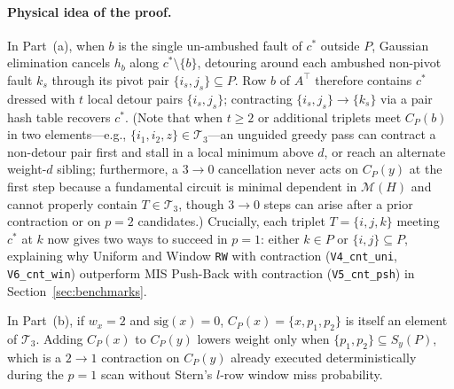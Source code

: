 \documentclass[12pt]{article}
\theoremstyle{definition}
\newcommand{\Tc}{\mathcal{T}_3}
\newcommand{\ttt}[1]{\texttt{#1}}
\begin{document}
\paragraph{Physical idea of the proof.}
In Part~(a), when $b$ is the single un-ambushed fault of $c^*$ outside $P$, Gaussian elimination cancels $h_b$
along $c^* \setminus \{b\}$, detouring around each ambushed non-pivot fault $k_s$ through its pivot pair $\{i_s,
j_s\} \subseteq P$. Row $b$ of $A^\top$ therefore contains $c^*$ dressed with $t$ local detour pairs $\{i_s,
j_s\}$; contracting $\{i_s, j_s\} \to \{k_s\}$ via a pair hash table recovers $c^*$. (Note that when $t \ge 2$ or
additional triplets meet $C_P(b)$ in two elements---e.g., $\{i_1, i_2, z\} \in \Tc$---an unguided greedy pass can
contract a non-detour pair first and stall in a local minimum above $d$, or reach an alternate weight-$d$ sibling;
furthermore, a $3 \to 0$ cancellation never acts on $C_P(y)$ at the first step because a fundamental circuit is
minimal dependent in $\mathcal{M}(H)$ and cannot properly contain $T \in \Tc$, though $3 \to 0$ steps can arise
after a prior contraction or on $p = 2$ candidates.) Crucially, each triplet $T = \{i, j, k\}$ meeting $c^*$ at $k$
now gives two ways to succeed in $p = 1$: either $k \in P$ or $\{i, j\} \subseteq P$, explaining why Uniform and
Window \ttt{RW} with contraction (\ttt{V4\_cnt\_uni}, \ttt{V6\_cnt\_win}) outperform MIS Push-Back with contraction
(\ttt{V5\_cnt\_psh}) in Section~\ref{sec:benchmarks}.

In Part~(b), if $w_x = 2$ and $\mathrm{sig}(x) = 0$, $C_P(x) = \{x, p_1, p_2\}$ is itself an element of $\Tc$.
Adding $C_P(x)$ to $C_P(y)$ lowers weight only when $\{p_1, p_2\} \subseteq S_y(P)$, which is a $2 \to 1$
contraction on $C_P(y)$ already executed deterministically during the $p = 1$ scan without Stern's $l$-row window
miss probability.
\end{document}
